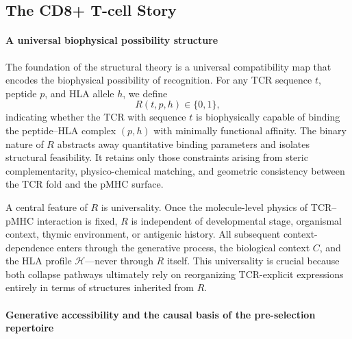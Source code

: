 \documentclass[11pt]{article}
\begin{document}
\subsection{The CD8+ T-cell Story}

\paragraph{A universal biophysical possibility structure}


The foundation of the structural theory is a universal compatibility map that encodes the biophysical possibility of recognition. For any TCR sequence \(t\), peptide \(p\), and HLA allele \(h\), we define
\[
    R(t,p,h)\in\{0,1\},
\]
indicating whether the TCR with sequence \(t\) is biophysically capable of binding the peptide–HLA complex \((p,h)\) with minimally functional affinity. The binary nature of \(R\) abstracts away quantitative binding parameters and isolates structural feasibility. It retains only those constraints arising from steric complementarity, physico-chemical matching, and geometric consistency between the TCR fold and the pMHC surface.

A central feature of \(R\) is universality. Once the molecule-level physics of TCR–pMHC interaction is fixed, \(R\) is independent of developmental stage, organismal context, thymic environment, or antigenic history. All subsequent context-dependence enters through the generative process, the biological context \(C\), and the HLA profile \(\mathcal{H}\)—never through \(R\) itself. This universality is crucial because both collapse pathways ultimately rely on reorganizing TCR-explicit expressions entirely in terms of structures inherited from \(R\).

\paragraph{Generative accessibility and the causal basis of the pre-selection repertoire}
\end{document}
